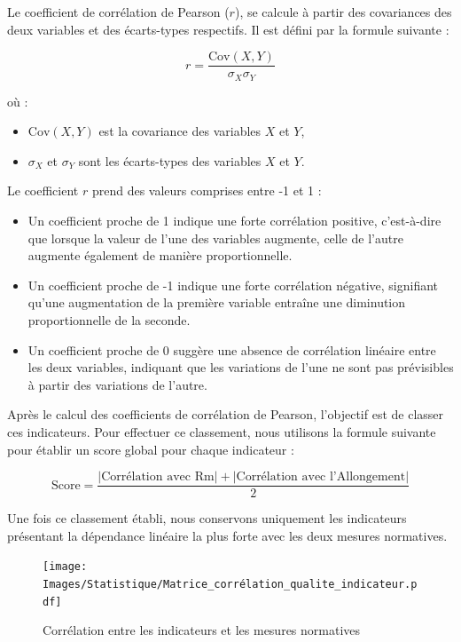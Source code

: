 \documentclass[12pt]{article}
\begin{document}
Le coefficient de corrélation de Pearson (\( r \)), se calcule 
à partir des covariances des deux variables et des écarts-types respectifs.
Il est défini par la formule suivante :

\[
r = \frac{\text{Cov}(X,Y)}{\sigma_X \sigma_Y}
\]

où :
\begin{itemize}
    \item \(\text{Cov}(X,Y)\) est la covariance des variables \( X \) et \( Y \),
    \item \(\sigma_X\) et \(\sigma_Y\) sont les écarts-types des variables \( X \) et \( Y \).
\end{itemize}

Le coefficient \( r \) prend des valeurs comprises entre -1 et 1 :
\begin{itemize}
    \item Un coefficient proche de 1 indique une forte corrélation positive, c'est-à-dire que lorsque la valeur de l'une des variables augmente, celle de l'autre augmente également de manière proportionnelle.
    \item Un coefficient proche de -1 indique une forte corrélation négative, signifiant qu'une augmentation de la première variable entraîne une diminution proportionnelle de la seconde.
    \item Un coefficient proche de 0 suggère une absence de corrélation linéaire entre les deux variables, indiquant que les variations de l'une ne sont pas prévisibles à partir des variations de l'autre.
\end{itemize}

Après le calcul des coefficients de corrélation de Pearson, l'objectif 
est de classer ces indicateurs.
Pour effectuer ce classement, nous utilisons 
la formule suivante pour établir un score global pour chaque indicateur :

\[
\text{Score} = \frac{|\text{Corrélation avec Rm}| + |\text{Corrélation avec l'Allongement}|}{2}
\]


Une fois ce classement établi, nous conservons uniquement les indicateurs 
présentant la dépendance linéaire la plus forte avec les deux mesures 
normatives. 


\begin{figure}[H]
    \texttt{[image: Images/Statistique/Matrice\_corrélation\_qualite\_indicateur.pdf]} 
    \caption{Corrélation entre les indicateurs et les mesures normatives}
    \label{fig:Corrélation1}
\end{figure}
\end{document}
